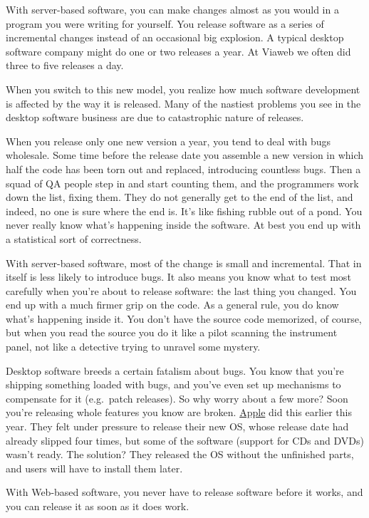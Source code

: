 \documentclass[12pt]{book}
\begin{document}
With server-based software, you can make changes almost as you would in
a program you were writing for yourself. You release software as a
series of incremental changes instead of an occasional big explosion. A
typical desktop software company might do one or two releases a year. At
Viaweb we often did three to five releases a day.

When you switch to this new model, you realize how much software
development is affected by the way it is released. Many of the nastiest
problems you see in the desktop software business are due to
catastrophic nature of releases.

When you release only one new version a year, you tend to deal with bugs
wholesale. Some time before the release date you assemble a new version
in which half the code has been torn out and replaced, introducing
countless bugs. Then a squad of QA people step in and start counting
them, and the programmers work down the list, fixing them. They do not
generally get to the end of the list, and indeed, no one is sure where
the end is. It's like fishing rubble out of a pond. You never really
know what's happening inside the software. At best you end up with a
statistical sort of correctness.

With server-based software, most of the change is small and incremental.
That in itself is less likely to introduce bugs. It also means you know
what to test most carefully when you're about to release software: the
last thing you changed. You end up with a much firmer grip on the code.
As a general rule, you do know what's happening inside it. You don't
have the source code memorized, of course, but when you read the source
you do it like a pilot scanning the instrument panel, not like a
detective trying to unravel some mystery.

Desktop software breeds a certain fatalism about bugs. You know that
you're shipping something loaded with bugs, and you've even set up
mechanisms to compensate for it (e.g.~patch releases). So why worry
about a few more? Soon you're releasing whole features you know are
broken. \href{http://news.cnet.com/news/0-1006-200-5195914.html}{Apple}
did this earlier this year. They felt under pressure to release their
new OS, whose release date had already slipped four times, but some of
the software (support for CDs and DVDs) wasn't ready. The solution? They
released the OS without the unfinished parts, and users will have to
install them later.

With Web-based software, you never have to release software before it
works, and you can release it as soon as it does work.
\end{document}
